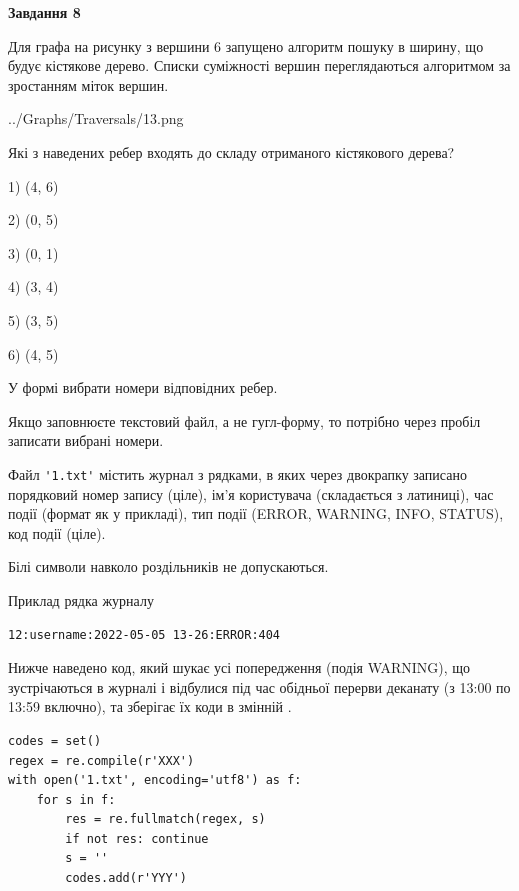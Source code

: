 \documentclass[12pt, ukrainian]{article}
\def\code#1{\Verb!#1!}
\begin{document}
{\begin {large}
{\begin {center}\textbf{Завдання 8}\end {center}}\par
Для графа на рисунку з вершини 6 запущено алгоритм пошуку в ширину, що будує кістякове дерево. Списки суміжності вершин переглядаються алгоритмом за зростанням міток вершин.\par
\begin{center}
	{../Graphs/Traversals/13.png}
\end{center}
\par Які з наведених ребер входять до складу отриманого кістякового дерева?\par
1) (4, 6)\par
2) (0, 5)\par
3) (0, 1)\par
4) (3, 4)\par
5) (3, 5)\par
6) (4, 5)\par
{\vskip 15pt} У формі вибрати номери відповідних ребер.


Якщо заповнюєте текстовий файл, а не гугл-форму, то потрібно через пробіл записа\-ти вибрані номери.\par
\newpage


Файл \code{'1.txt'} містить журнал з рядками, в яких через двокрапку записано поряд\-ко\-вий номер запису (ціле), ім'я користувача (складається з латиниці), час події (фор\-мат як у прикладі), тип події (ERROR, WARNING, INFO, STATUS), код події (ціле).

Білі символи навколо роздільників не допускаються.

Приклад рядка журналу



\begin{verbatim}
12:username:2022-05-05 13-26:ERROR:404
\end{verbatim}


Нижче наведено код, який шукає усі попередження (подія WARNING), що зустрі\-ча\-ються в журналі і відбулися під час обідньої перерви деканату (з 13:00 по 13:59 включно), та зберігає їх коди в змінній .



\begin{verbatim}
codes = set()
regex = re.compile(r'XXX')
with open('1.txt', encoding='utf8') as f:
    for s in f:
        res = re.fullmatch(regex, s)
        if not res: continue
        s = ''
        codes.add(r'YYY')
\end{verbatim}





\end{large}}
\end{document}
